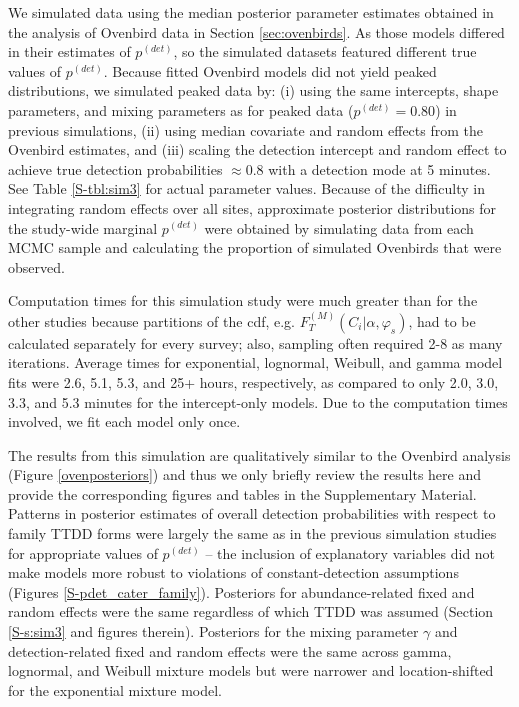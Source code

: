 \documentclass[12pt]{article}
\newcommand{\pdet}{p^{(det)}}
\newcommand{\Fm}{F_T^{(M)}}
\begin{document}
We simulated data using the median posterior parameter estimates obtained in the analysis of Ovenbird data in Section \ref{sec:ovenbirds}.
As those models differed in their estimates of $\pdet$, so the simulated datasets featured different true values of $\pdet$.
Because fitted Ovenbird models did not yield peaked distributions, we simulated peaked data by: (i) using the same intercepts, shape parameters, and mixing parameters as for peaked data ($\pdet = 0.80$) in previous simulations, (ii) using median covariate and random effects from the Ovenbird estimates, and (iii) scaling the detection intercept and random effect to achieve true detection probabilities $\approx 0.8$ with a detection mode at 5 minutes.
See Table \ref{S-tbl:sim3} for actual parameter values.
Because of the difficulty in integrating random effects over all sites, approximate posterior distributions for the study-wide marginal $\pdet$ were obtained by simulating data from each MCMC sample and calculating the proportion of simulated Ovenbirds that were observed.

Computation times for this simulation study were much greater than for the other studies because partitions of the cdf, e.g. $\Fm(C_i|\alpha,\varphi_s)$, had to be calculated separately for every survey; also, sampling often required 2-8 as many iterations.
Average times for exponential, lognormal, Weibull, and gamma model fits were 2.6, 5.1, 5.3, and 25+ hours, respectively, as compared to only 2.0, 3.0, 3.3, and 5.3 minutes for the intercept-only models.
Due to the computation times involved, we fit each model only once.

The results from this simulation are qualitatively similar to the Ovenbird analysis (Figure \ref{ovenposteriors}) and thus we only briefly review the results here and provide the corresponding figures and tables in the Supplementary Material. 
Patterns in posterior estimates of overall detection probabilities with respect to family TTDD forms were largely the same as in the previous simulation studies for appropriate values of $\pdet$ -- the inclusion of explanatory variables did not make models more robust to violations of constant-detection assumptions (Figures \ref{S-pdet_cater_family}).  
Posteriors for abundance-related fixed and random effects were the same regardless of which TTDD was assumed (Section \ref{S-s:sim3} and figures therein).  
Posteriors for the mixing parameter $\gamma$ and detection-related fixed and random effects were the same across gamma, lognormal, and Weibull mixture models but were narrower and location-shifted for the exponential mixture model.  
\end{document}
